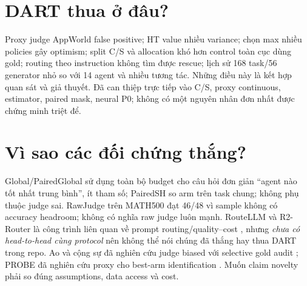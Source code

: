 \documentclass[11pt,a4paper,openany]{book}
\begin{document}
\section{DART thua ở đâu?}
Proxy judge AppWorld false positive; HT value nhiều variance; chọn max nhiều policies gây optimism; split C/S và allocation khó hơn control toàn cục dùng gold; routing theo instruction không tìm được rescue; lịch sử 168 task/56 generator nhỏ so với 14 agent và nhiều tương tác. Những điều này là kết hợp quan sát và giả thuyết. Đã can thiệp trực tiếp vào C/S, proxy continuous, estimator, paired mask, neural P0; không có một nguyên nhân đơn nhất được chứng minh triệt để.

\section{Vì sao các đối chứng thắng?}
Global/PairedGlobal sử dụng toàn bộ budget cho câu hỏi đơn giản ``agent nào tốt nhất trung bình'', ít tham số; PairedSH so arm trên task chung; không phụ thuộc judge sai. RawJudge trên MATH500 đạt 46/48 vì sample không có accuracy headroom; không có nghĩa raw judge luôn mạnh. RouteLLM và R2-Router là công trình liên quan về prompt routing/quality--cost \cite{routellm,r2router}, nhưng \emph{chưa có head-to-head cùng protocol} nên không thể nói chúng đã thắng hay thua DART trong repo. Ao và cộng sự đã nghiên cứu judge biased với selective gold audit \cite{ao}; PROBE đã nghiên cứu proxy cho best-arm identification \cite{probe}. Muốn claim novelty phải so đúng assumptions, data access và cost.
\end{document}
